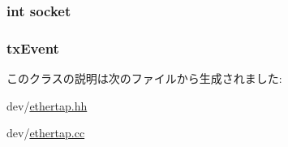 \label{classEtherTap_a64872f3fc85b752e1d265c01ae4efc14}
\hypertarget{classEtherTap_a3666576f6b88007cc7b8f26c7da596c8}{
\subsubsection[{socket}]{\setlength{\rightskip}{0pt plus 5cm}int {\bf socket}}}
\label{classEtherTap_a3666576f6b88007cc7b8f26c7da596c8}
\hypertarget{classEtherTap_a324fed072a29716c20a98a82927bd2a2}{
\subsubsection[{txEvent}]{ {\bf txEvent}}}
\label{classEtherTap_a324fed072a29716c20a98a82927bd2a2}


このクラスの説明は次のファイルから生成されました:\begin{DoxyCompactItemize}
\item 
dev/\hyperlink{ethertap_8hh}{ethertap.hh}\item 
dev/\hyperlink{ethertap_8cc}{ethertap.cc}\end{DoxyCompactItemize}

